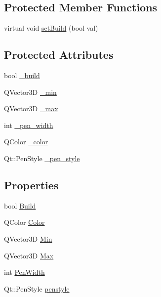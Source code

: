 \subsection*{Protected Member Functions}
\begin{DoxyCompactItemize}
\item 
virtual void \hyperlink{classShipCADGeometry_1_1Entity_a1889198398f42bb7f77a2334031c3f33}{set\-Build} (bool val)
\end{DoxyCompactItemize}
\subsection*{Protected Attributes}
\begin{DoxyCompactItemize}
\item 
bool \hyperlink{classShipCADGeometry_1_1Entity_aadcf171a362955d78fd34d8b5919745d}{\-\_\-build}
\item 
Q\-Vector3\-D \hyperlink{classShipCADGeometry_1_1Entity_a873861fe2282f4300ef60c846bd7469e}{\-\_\-min}
\item 
Q\-Vector3\-D \hyperlink{classShipCADGeometry_1_1Entity_a3dc59ce1edbde84e85f1b096466eb497}{\-\_\-max}
\item 
int \hyperlink{classShipCADGeometry_1_1Entity_af9d015ffcbdc506db94c677be5b2f8ec}{\-\_\-pen\-\_\-width}
\item 
Q\-Color \hyperlink{classShipCADGeometry_1_1Entity_a5107c39b85d2fe2cad3d8266a62168ac}{\-\_\-color}
\item 
Qt\-::\-Pen\-Style \hyperlink{classShipCADGeometry_1_1Entity_ab251bdeaec08bb1474ba57725735198a}{\-\_\-pen\-\_\-style}
\end{DoxyCompactItemize}
\subsection*{Properties}
\begin{DoxyCompactItemize}
\item 
bool \hyperlink{classShipCADGeometry_1_1Entity_a9dc2f1b0245a88b3ed9b9b47f626fdb3}{Build}
\item 
Q\-Color \hyperlink{classShipCADGeometry_1_1Entity_a55bb9634ac4c8f08909376006de897b4}{Color}
\item 
Q\-Vector3\-D \hyperlink{classShipCADGeometry_1_1Entity_a3bd95518fc98793471c03637679081a8}{Min}
\item 
Q\-Vector3\-D \hyperlink{classShipCADGeometry_1_1Entity_a9b51589fe54df18ce1ca593de6e8bd1f}{Max}
\item 
int \hyperlink{classShipCADGeometry_1_1Entity_a236c42fc6ed4a8478760baf81551620f}{Pen\-Width}
\item 
Qt\-::\-Pen\-Style \hyperlink{classShipCADGeometry_1_1Entity_adf613c5cb8169e0915f8d15aad664d4a}{penstyle}
\end{DoxyCompactItemize}


